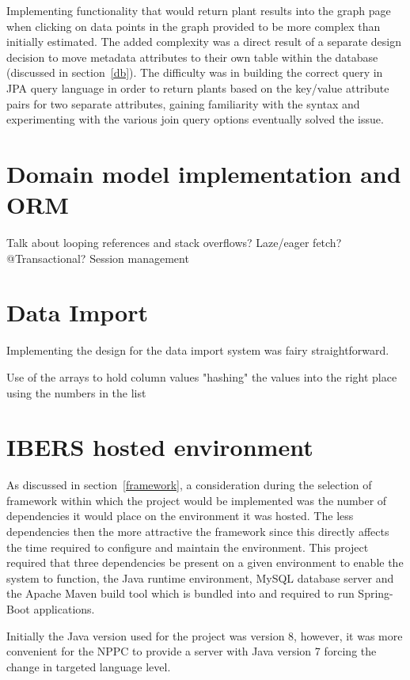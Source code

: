 Implementing functionality that would return plant results into the graph page when clicking on data points in the graph provided to be more complex than initially estimated. The added complexity was a direct result of a separate design decision to move metadata attributes to their own table within the database (discussed in section~\ref{db}). The difficulty was in building the correct query in JPA query language in order to return plants based on the key/value attribute pairs for two separate attributes, gaining familiarity with the syntax and experimenting with the various join query options eventually solved the issue.

\section{Domain model implementation and ORM}
Talk about looping references and stack overflows? Laze/eager fetch? @Transactional?  Session management

\section{Data Import}
Implementing the design for the data import system was fairy straightforward.

Use of the arrays to hold column values "hashing" the values into the right place using the numbers in the list

\section{IBERS hosted environment}\label{hosting}

As discussed in section~\ref{framework}, a consideration during the selection of framework within which the project would be implemented was the number of dependencies it would place on the environment it was hosted. The less dependencies then the more attractive the framework since this directly affects the time required to configure and maintain the environment. This project required that three dependencies be present on a given environment to enable the system to function, the Java runtime environment, MySQL database server and the Apache Maven build tool which is bundled into and required to run Spring-Boot applications. 

Initially the Java version used for the project was version 8, however, it was more convenient for the NPPC to provide a server with Java version 7 forcing the change in targeted language level.

